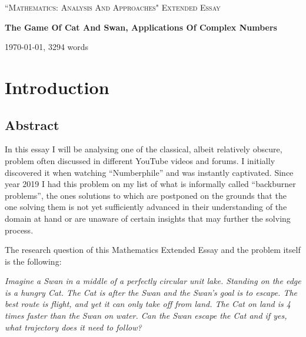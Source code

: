 \documentclass[12pt]{article}
\begin{document}
\pagestyle{fancy}
\begin{titlepage}
	\centering
	\vspace{1cm}
	{\Large \textsc{``Mathematics: Analysis And Approaches" Extended Essay}\par}
	\vspace{1.5cm}
	{\huge\bfseries The Game Of Cat And Swan, Applications Of Complex Numbers\par}
	\vspace{2cm}
	\vfill
	{\large \today, 3294 words\par}
\end{titlepage}


\clearpage
{}
\tableofcontents


\section{Introduction}
\subsection{Abstract}

In this essay I will be analysing one of the classical, albeit relatively obscure, problem often discussed in different YouTube videos and forums. I initially discovered it when watching ``Numberphile''\citep{Catandmouse} and was instantly captivated. Since year 2019 I had this problem on my list of what is informally called ``backburner problems'', the ones solutions to which are postponed on the grounds that the one solving them is not yet sufficiently advanced in their understanding of the domain at hand or are unaware of certain insights that may further the solving process.

The research question of this Mathematics Extended Essay and the problem itself is the following:

\emph{Imagine a Swan in a middle of a perfectly circular unit lake. Standing on the edge is a hungry Cat. The Cat is after the Swan and the Swan's goal is to escape. The best route is flight, and yet it can only take off from land. The Cat on land is 4 times faster than the Swan on water. Can the Swan escape the Cat and if yes, what trajectory does it need to follow?}
\end{document}
